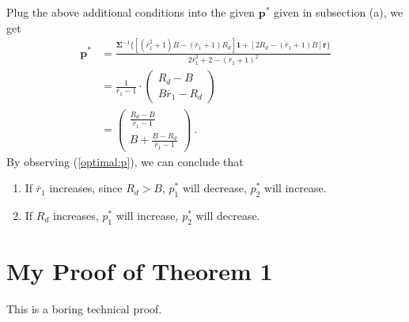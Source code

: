 \documentclass[12pt]{ftec2101}
\newcommand{\matr}[1]{\mathbf{#1}}
\newcommand{\vect}[1]{\mathbf{#1}}
\begin{document}
\noindent
Plug the above additional conditions into the given $\vect{p}^{*}$ given in subsection (a), we get
\begin{align}
    \vect{p}^{*} &= \frac{\matr{\Sigma}^{-1}\{[(\bar{r}_1^2+1)B-(\bar{r}_1+1)R_d]\vect{1}+[2R_d - (\bar{r}_1 + 1)B]\bar{\vect{r}}\}}{2\bar{r}_1^2 + 2 - (\bar{r}_1+1)^2} \\
    &= \frac{1}{\bar{r}_1 - 1} \cdot
    \begin{pmatrix}
        R_d - B \\
        B\bar{r}_1 - R_d
    \end{pmatrix}\\
    &=
    \begin{pmatrix}
        \frac{R_d-B}{\bar{r}_1 - 1} \\
        B+ \frac{B-R_d}{\bar{r}_1 - 1}
    \end{pmatrix}\ .
    \label{optimal:p}
\end{align}
By observing (\ref{optimal:p}), we can conclude that
\begin{enumerate}
    \item If $\bar{r}_1$ increases, since $R_d > B$, $p_1^{*}$ will decrease, $p_2^{*}$ will increase.
    \item If $R_d$ increases, $p_1^{*}$ will increase, $p_2^{*}$ will decrease.
\end{enumerate}


\appendix

\section{My Proof of Theorem 1}

This is a boring technical proof.
 
\end{document}
